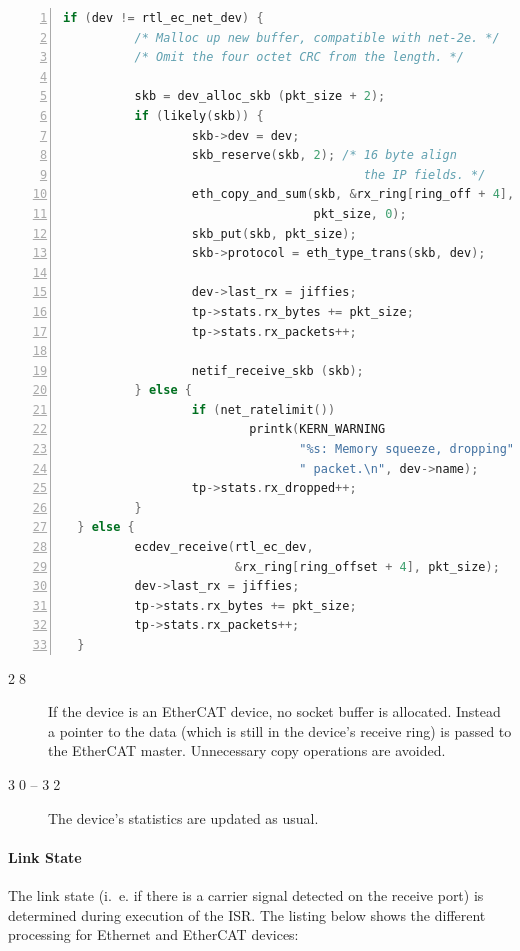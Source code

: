 \documentclass[a4paper,12pt,BCOR6mm,bibtotoc,idxtotoc]{scrbook}
\newcommand{\linenum}[1]{\normalfont\textcircled{\tiny #1}}
\begin{document}
\begin{lstlisting}[gobble=2,language=C,numbers=left]
  if (dev != rtl_ec_net_dev) {
          /* Malloc up new buffer, compatible with net-2e. */
          /* Omit the four octet CRC from the length. */

          skb = dev_alloc_skb (pkt_size + 2);
          if (likely(skb)) {
                  skb->dev = dev;
                  skb_reserve(skb, 2); /* 16 byte align
                                          the IP fields. */
                  eth_copy_and_sum(skb, &rx_ring[ring_off + 4],
                                   pkt_size, 0);
                  skb_put(skb, pkt_size);
                  skb->protocol = eth_type_trans(skb, dev);

                  dev->last_rx = jiffies;
                  tp->stats.rx_bytes += pkt_size;
                  tp->stats.rx_packets++;

                  netif_receive_skb (skb);
          } else {
                  if (net_ratelimit())
                          printk(KERN_WARNING
                                 "%s: Memory squeeze, dropping"
                                 " packet.\n", dev->name);
                  tp->stats.rx_dropped++;
          }
  } else {
          ecdev_receive(rtl_ec_dev,
                        &rx_ring[ring_offset + 4], pkt_size);
          dev->last_rx = jiffies;
          tp->stats.rx_bytes += pkt_size;
          tp->stats.rx_packets++;
  }
\end{lstlisting}

\begin{description}
\item[\linenum{28}] If the device is an EtherCAT
  device, no socket buffer is allocated. Instead a pointer to the data
  (which is still in the device's receive ring) is passed to the
  EtherCAT master. Unnecessary copy operations are avoided.
\item[\linenum{30} -- \linenum{32}] The
  device's statistics are updated as usual.
\end{description}

\paragraph{Link State}

The link state (i.~e. if there is a carrier signal detected on the
receive port) is determined during execution of the ISR. The listing
below shows the different processing for Ethernet and EtherCAT
devices:
\end{document}
